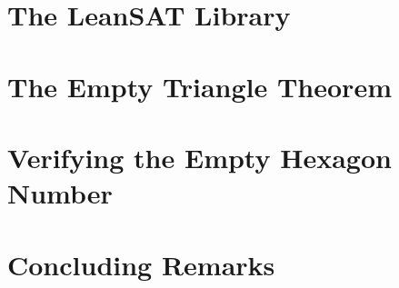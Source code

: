 \documentclass{easychair}
\begin{document}
\section{The LeanSAT Library}
\label{sec:leansat}


\section{The Empty Triangle Theorem}
\label{sec:empty-triangle}


\section{Verifying the Empty Hexagon Number}
\label{sec:empty-hexagon-number}



\section{Concluding Remarks}
\label{sec:conclusion}


% 
% 
% 

\end{document}
